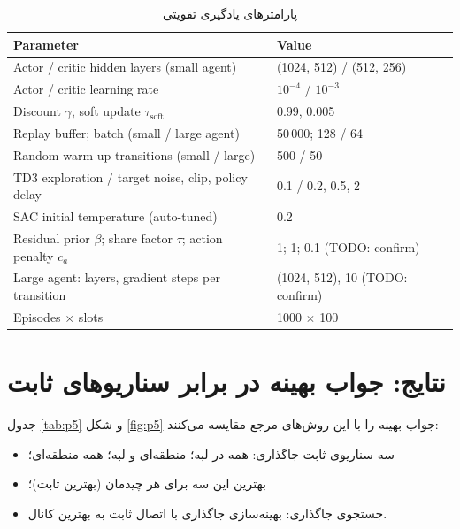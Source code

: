 \documentclass[12pt,oneside]{report}
\begin{document}
\begin{table}[H]
	\centering
	\caption{پارامترهای یادگیری تقویتی}\label{tab:rl}
	\begin{latin}
		\begin{tabular}{p{8.5cm}p{5.5cm}}
			\toprule
			Parameter & Value \\
			\midrule
			Actor / critic hidden layers (small agent) & (1024, 512) / (512, 256) \\
			Actor / critic learning rate & $10^{-4}$ / $10^{-3}$ \\
			Discount $\gamma$, soft update $\tau_{\text{soft}}$ & 0.99, 0.005 \\
			Replay buffer; batch (small / large agent) & 50\,000; 128 / 64 \\
			Random warm-up transitions (small / large) & 500 / 50 \\
			TD3 exploration / target noise, clip, policy delay & 0.1 / 0.2, 0.5, 2 \\
			SAC initial temperature (auto-tuned) & 0.2 \\
			Residual prior $\beta$; share factor $\tau$; action penalty $c_a$ & 1; 1; 0.1 \quad (TODO: confirm) \\
			Large agent: layers, gradient steps per transition & (1024, 512), 10 \quad (TODO: confirm) \\
			Episodes $\times$ slots & 1000 $\times$ 100 \\
			\bottomrule
		\end{tabular}
	\end{latin}
\end{table}

\section{نتایج: جواب بهینه در برابر سناریوهای ثابت}\label{sec:res_opt}
جدول \ref{tab:p5} و شکل \ref{fig:p5} جواب بهینه را با این روش‌های مرجع مقایسه می‌کنند:
\begin{itemize}
	\item سه سناریوی ثابت جاگذاری: همه در لبه؛  منطقه‌ای و  لبه؛ همه منطقه‌ای؛
	\item بهترین این سه برای هر چیدمان (بهترین ثابت)؛
	\item جستجوی جاگذاری: بهینه‌سازی جاگذاری با اتصال ثابت به بهترین کانال.
\end{itemize}
\end{document}

